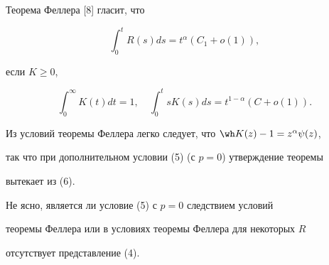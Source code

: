 \begin{cornonum}
Теорема Феллера [8] гласит, что 


$$ 


\int^t_0 R(s)ds=t^\alpha(C_1+o(1)), 


$$ 


если $K\ge 0$, 


$$ 


\int^\infty_0 K(t)dt=1,\quad 


\int^t_0 s K(s)ds=t^{1-\alpha}(C+o(1)). 


$$ 


Из условий теоремы Феллера легко следует, что $\wh 


K(z)-1=z^\alpha\psi(z)$, 


так что при дополнительном условии (5) (с $p=0$) утверждение теоремы 


вытекает из (6). 


 


Не ясно, является ли условие (5) с $p=0$ следствием условий 


теоремы Феллера или в условиях теоремы Феллера для некоторых $R$ 


отсутствует представление (4). 


\end{cornonum} 


 


